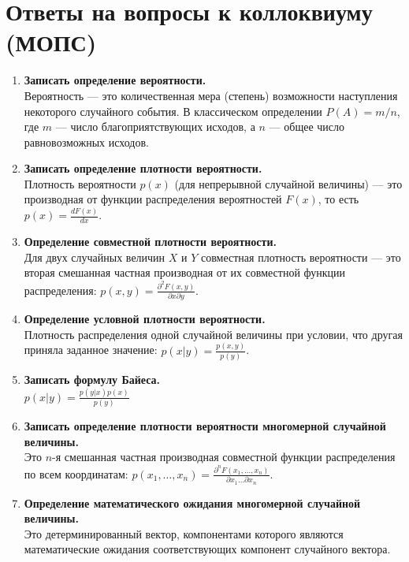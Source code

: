 \documentclass[12pt, a4paper]{article}
\begin{document}
\section*{Ответы на вопросы к коллоквиуму (МОПС)}

\begin{enumerate}
    \item \textbf{Записать определение вероятности.} \\
    Вероятность — это количественная мера (степень) возможности наступления некоторого случайного события. В классическом определении $P(A) = m/n$, где $m$ — число благоприятствующих исходов, а $n$ — общее число равновозможных исходов.

    \item \textbf{Записать определение плотности вероятности.} \\
    Плотность вероятности $p(x)$ (для непрерывной случайной величины) — это производная от функции распределения вероятностей $F(x)$, то есть $p(x) = \frac{dF(x)}{dx}$.

    \item \textbf{Определение совместной плотности вероятности.} \\
    Для двух случайных величин $X$ и $Y$ совместная плотность вероятности — это вторая смешанная частная производная от их совместной функции распределения: $p(x, y) = \frac{\partial^2 F(x,y)}{\partial x \partial y}$.

    \item \textbf{Определение условной плотности вероятности.} \\
    Плотность распределения одной случайной величины при условии, что другая приняла заданное значение: $p(x|y) = \frac{p(x,y)}{p(y)}$.

    \item \textbf{Записать формулу Байеса.} \\
    $p(x|y) = \frac{p(y|x)p(x)}{p(y)}$

    \item \textbf{Записать определение плотности вероятности многомерной случайной величины.} \\
    Это $n$-я смешанная частная производная совместной функции распределения по всем координатам: $p(x_1, \dots, x_n) = \frac{\partial^n F(x_1, \dots, x_n)}{\partial x_1 \dots \partial x_n}$.

    \item \textbf{Определение математического ожидания многомерной случайной величины.} \\
    Это детерминированный вектор, компонентами которого являются математические ожидания соответствующих компонент случайного вектора.


\end{enumerate}
\end{document}
